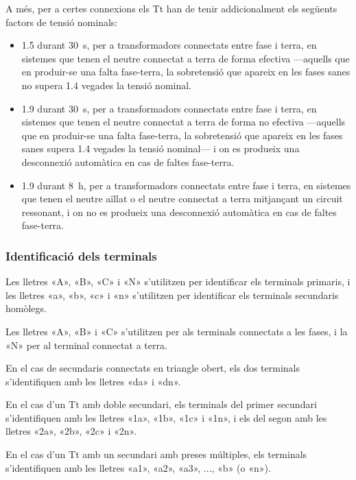 A més, per a certes connexions els Tt han de tenir addicionalment els següents factors de tensió nominals:
 \begin{itemize}
   \item \num{1,5} durant \qty{30}{s},  per a transformadors connectats entre fase i terra, en sistemes que tenen el neutre connectat a terra de forma efectiva ---aquells que en produir-se una falta fase-terra, la sobretensió que apareix en les fases sanes no supera \num{1,4} vegades la tensió nominal.
   \item \num{1,9} durant \qty{30}{s},  per a transformadors connectats entre fase i terra, en sistemes que tenen el neutre connectat a terra de forma no efectiva ---aquells que en produir-se una falta fase-terra, la sobretensió que apareix en les fases sanes  supera \num{1,4} vegades la tensió nominal--- i on es produeix una desconnexió automàtica  en cas de faltes fase-terra.
   \item \num{1,9} durant \qty{8}{h},  per a transformadors connectats entre fase i terra, en sistemes que tenen el neutre aïllat o el neutre connectat a terra mitjançant un circuit ressonant, i on no es produeix una desconnexió automàtica  en cas de faltes fase-terra.
\end{itemize}

\subsubsection{Identificació dels terminals}

 Les lletres «A», «B», «C» i «N» s'utilitzen per identificar els terminals primaris, i les lletres «a», «b», «c» i «n» s'utilitzen per identificar els terminals secundaris homòlegs.

 Les lletres «A», «B» i «C» s'utilitzen per als terminals connectats a les fases, i la «N» per al terminal connectat a terra.

 En el cas de secundaris connectats en triangle obert, els dos terminals s'identifiquen amb les lletres «da» i «dn».

 En el cas d'un Tt amb doble secundari, els terminals del  primer secundari s'identifiquen amb les lletres  «1a», «1b», «1c» i «1n», i els del segon amb les lletres  «2a», «2b», «2c» i «2n».

 En el cas d'un Tt amb un  secundari amb preses múltiples, els terminals s'identifiquen amb les lletres  «a1», «a2», «a3», ..., «b» (o «n»).

